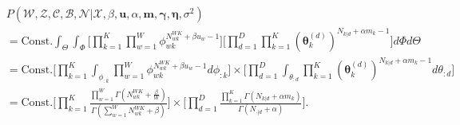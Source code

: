 \documentclass[a4paper]{article}
\begin{document}
  \begin{equation}
  \begin{aligned}
  &P(\mathcal{W}, \mathcal{Z}, \mathcal{C}, \mathcal{B}, \mathcal{N}| \mathcal{X}, \beta, \boldsymbol{u}, \alpha, \boldsymbol{m}, \boldsymbol{\gamma}, \boldsymbol{\eta}, \sigma^2)\\&=\mbox{Const.}\int_{\Theta}\int_{\Phi}\Big[\prod_{k=1}^{K}\prod_{w=1}^{W}\phi_{wk}^{N^{WK}_{wk}+\beta u_w-1}\Big]\Big[\prod_{d=1}^{D}\prod_{k=1}^{K}(\boldsymbol{\theta}^{(d)}_{k})^{N_{k|d}+\alpha m_k-1}\Big]d\Phi d\Theta
  \\&=\mbox{Const.}\Big[\prod_{k=1}^{K}\int_{\phi_{:k}}\prod_{w=1}^{W}\phi_{wk}^{N^{WK}_{wk}+\beta u_w-1  }d\phi_{:k}\Big]\times\Big[\prod_{d=1}^{D}\int_{\theta_{:d}}\prod_{k=1}^{K}(\boldsymbol{\theta}^{(d)}_{k})^{N_{k|d}+\alpha m_k-1}d\theta_{:d}\Big]
  \\&=\mbox{Const.}\Big[\prod_{k=1}^{K}\frac{\prod_{w=1}^W\Gamma(N_{wk}^{WK}+\frac{\beta}{W})}{\Gamma(\sum_{w=1}^WN_{wk}^{WK}+\beta )}\Big]\times\Big[\prod_{d=1}^{D}\frac{\prod_{k=1}^K\Gamma(N_{k|d}+\alpha m_k)}{\Gamma(N_{\cdot|d}+\alpha)}\Big].
  \end{aligned}
  \end{equation}
\end{document}
